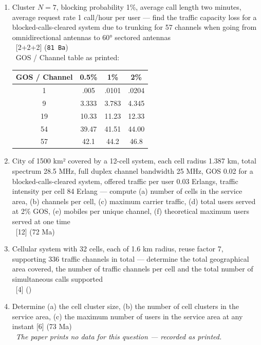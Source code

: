 \documentclass[12pt]{article}
\newcommand{\enter}{\\\textcolor{white}{1}}
\begin{document}
\begin{enumerate}[topsep=0pt, noitemsep]
\begin{center}
\begin{tabular}{|c|c|c|c|c|c|c|c|c|}
        \end{tabular}
        \end{center}
      \item Cluster $N = 7$, blocking probability 1\%, average call length two minutes,
        average request rate 1 call/hour per user --- find the traffic capacity loss for a
        blocked-calls-cleared system due to trunking for 57 channels when going from
        omnidirectional antennas to 60° sectored antennas
        \enter\hfill [2+2+2] (\texttt{81 Ba})
        \enter GOS / Channel table as printed:
        \begin{center}\small
        \begin{tabular}{|c|c|c|c|}
        \hline
        GOS / Channel & 0.5\% & 1\% & 2\% \\ \hline
        1  & .005  & .0101 & .0204 \\ \hline
        9  & 3.333 & 3.783 & 4.345 \\ \hline
        19 & 10.33 & 11.23 & 12.33 \\ \hline
        54 & 39.47 & 41.51 & 44.00 \\ \hline
        57 & 42.1  & 44.2  & 46.8  \\ \hline
        \end{tabular}
        \end{center}
      \item City of 1500 km² covered by a 12-cell system, each cell radius 1.387 km, total
        spectrum 28.5 MHz, full duplex channel bandwidth 25 MHz, GOS 0.02 for a
        blocked-calls-cleared system, offered traffic per user 0.03 Erlangs, traffic intensity
        per cell 84 Erlang --- compute (a) number of cells in the service area, (b) channels
        per cell, (c) maximum carrier traffic, (d) total users served at 2\% GOS,
        (e) mobiles per unique channel, (f) theoretical maximum users served at one time
        \enter\hfill [12] (72 Ma)
      \item Cellular system with 32 cells, each of 1.6 km radius, reuse factor 7, supporting
        336 traffic channels in total --- determine the total geographical area covered, the
        number of traffic channels per cell and the total number of simultaneous calls supported
        \enter\hfill [4] ()
      \item Determine (a) the cell cluster size, (b) the number of cell clusters in the
        service area, (c) the maximum number of users in the service area at any instant
        \hfill [6] (73 Ma)
        \enter\emph{The paper prints no data for this question --- recorded as printed.}
    \end{enumerate}
\end{document}
